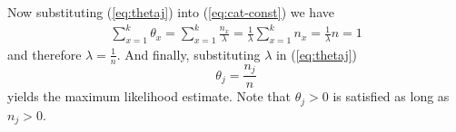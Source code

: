 Now substituting (\ref{eq:thetaj}) into (\ref{eq:cat-const}) we have
\begin{subequations}
\begin{align}
\sum_{x=1}^k \theta_x  = \sum_{x=1}^k \frac{n_x}{\lambda} = \frac{1}{\lambda} \sum_{x=1}^k n_x = \frac{1}{\lambda} n  = 1
\end{align}
\end{subequations}
and therefore $\lambda = \frac{1}{n}$. And finally, substituting $\lambda$ in (\ref{eq:thetaj})
\begin{equation}
	\theta_j =  \frac{n_j}{n}
\end{equation}
yields the maximum likelihood estimate.
Note that $\theta_j > 0$ is satisfied as long as $n_j > 0$.


